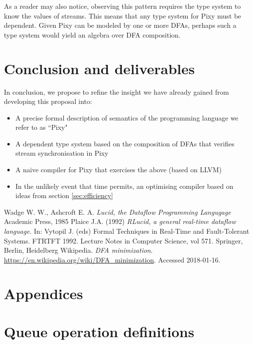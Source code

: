 \documentclass{scrartcl}
\begin{document}
    As a reader may also notice, observing this pattern requires the type system to know the values of streams. This means that any type system for Pixy must be dependent. Given Pixy can be modeled by one or more DFAs, perhaps such a type system would yield an algebra over DFA composition.
    
    \section{Conclusion and deliverables}

    In conclusion, we propose to refine the insight we have already gained from developing this proposal into:
    \begin{itemize}
        \item A precise formal description of semantics of the programming language we refer to as ``Pixy"
        \item A dependent type system based on the composition of DFAs that verifies stream synchronisation in Pixy
        \item A naive compiler for Pixy that exercises the above (based on LLVM)
        \item In the unlikely event that time permits, an optimising compiler based on ideas from section \ref{sec:efficiency}
    \end{itemize}

    
    \begin{thebibliography}{9}
            Wadge W. W.,
            Ashcroft E. A.
            \textit{Lucid, the Dataflow Programming Langugage}
            Academic Press, 1985
            Plaice J.A. (1992)
            \textit{RLucid, a general real-time dataflow language.}
            In: Vytopil J. (eds) Formal Techniques in Real-Time and Fault-Tolerant Systems. FTRTFT 1992. Lecture Notes in Computer Science, vol 571. Springer, Berlin, Heidelberg
            Wikipedia.
            \textit{DFA minimization}.
            \url{https://en.wikipedia.org/wiki/DFA_minimization}.
            Accessed 2018-01-16.
    \end{thebibliography}

    \section*{Appendices}

    \appendix

    \section{Queue operation definitions}
    \label{app:queueops}
\end{document}
